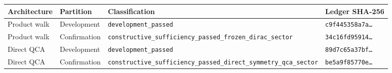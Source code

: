 \begin{tabular}{@{}llll@{}}
\toprule
Architecture & Partition & Classification & Ledger SHA-256 \\
\midrule
Product walk & Development & \texttt{development\_passed} & \texttt{c9f445358a7a\ldots} \\
Product walk & Confirmation & \texttt{constructive\_sufficiency\_passed\_frozen\_dirac\_sector} & \texttt{34c16fd95914\ldots} \\
Direct QCA & Development & \texttt{development\_passed} & \texttt{89d7c65a37bf\ldots} \\
Direct QCA & Confirmation & \texttt{constructive\_sufficiency\_passed\_direct\_symmetry\_qca\_sector} & \texttt{be5a9f85770e\ldots} \\
\bottomrule
\end{tabular}
